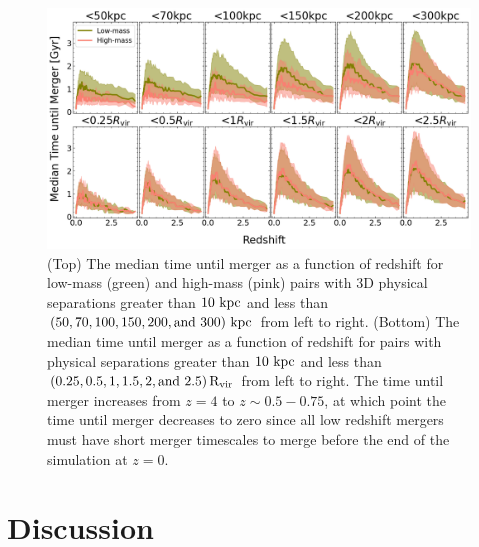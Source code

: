 \documentclass[twocolumn]{aastex631}
\newcommand{\Rvir}{\ensuremath{\rm R_{vir}}}
\begin{document}
\begin{figure}[htb]
    \centering
    \includegraphics[width=\textwidth]{plots/bet-on-it/3_time_til_merger.png}
    \caption{(Top) The median time until merger as a function of redshift for low-mass (green) and high-mass (pink) pairs with 3D physical separations greater than $10\,\mathrm{\,kpc}$ and less than $(50,70,100,150,200,\mbox{and }300)\,\mathrm{\,kpc}$ from left to right. 
    (Bottom) The median time until merger as a function of redshift for pairs with physical separations greater than $10\,\mathrm{\,kpc}$ and less than $(0.25, 0.5, 1, 1.5, 2,\mbox{and }2.5)\,\Rvir$ from left to right. 
    The time until merger increases from $z=4$ to $z\sim0.5-0.75$, at which point the time until merger decreases to zero since all low redshift mergers must have short merger timescales to merge before the end of the simulation at $z=0$. 
    }
    \label{fig:timescales-sep}
\end{figure}


\section{Discussion}
\end{document}
